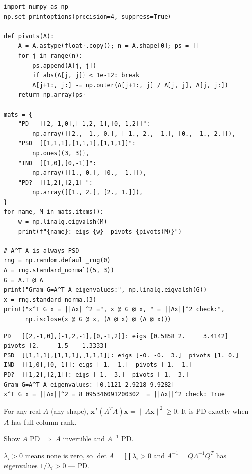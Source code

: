 \begin{lstlisting}[caption={\ttfamily code/ch09\_definiteness.py ---
eigenvalues vs.\ pivot signs on four matrices, then $A^{T}A$ is always
PSD.}]
import numpy as np
np.set_printoptions(precision=4, suppress=True)

def pivots(A):
    A = A.astype(float).copy(); n = A.shape[0]; ps = []
    for j in range(n):
        ps.append(A[j, j])
        if abs(A[j, j]) < 1e-12: break
        A[j+1:, j:] -= np.outer(A[j+1:, j] / A[j, j], A[j, j:])
    return np.array(ps)

mats = {
    "PD   [[2,-1,0],[-1,2,-1],[0,-1,2]]":
        np.array([[2., -1., 0.], [-1., 2., -1.], [0., -1., 2.]]),
    "PSD  [[1,1,1],[1,1,1],[1,1,1]]":
        np.ones((3, 3)),
    "IND  [[1,0],[0,-1]]":
        np.array([[1., 0.], [0., -1.]]),
    "PD?  [[1,2],[2,1]]":
        np.array([[1., 2.], [2., 1.]]),
}
for name, M in mats.items():
    w = np.linalg.eigvalsh(M)
    print(f"{name}: eigs {w}  pivots {pivots(M)}")

# A^T A is always PSD
rng = np.random.default_rng(0)
A = rng.standard_normal((5, 3))
G = A.T @ A
print("Gram G=A^T A eigenvalues:", np.linalg.eigvalsh(G))
x = rng.standard_normal(3)
print("x^T G x = ||Ax||^2 =", x @ G @ x, " = ||Ax||^2 check:",
      np.isclose(x @ G @ x, (A @ x) @ (A @ x)))
\end{lstlisting}

\begin{lstlisting}[caption={Output of the definiteness tests. Notice
pivots and eigenvalues agree in sign pattern on every case --- and the
Gram matrix's eigenvalues are all $\ge0$ because $x^{T}Gx=\lVert
Ax\rVert^{2}$ is a squared length, never negative.}]
PD   [[2,-1,0],[-1,2,-1],[0,-1,2]]: eigs [0.5858 2.     3.4142]  pivots [2.     1.5    1.3333]
PSD  [[1,1,1],[1,1,1],[1,1,1]]: eigs [-0. -0.  3.]  pivots [1. 0.]
IND  [[1,0],[0,-1]]: eigs [-1.  1.]  pivots [ 1. -1.]
PD?  [[1,2],[2,1]]: eigs [-1.  3.]  pivots [ 1. -3.]
Gram G=A^T A eigenvalues: [0.1121 2.9218 9.9282]
x^T G x = ||Ax||^2 = 8.095346091200302  = ||Ax||^2 check: True
\end{lstlisting}

\begin{proposition}
For any real $A$ (any shape),
$\mathbf x^{T}(A^{T}A)\mathbf x=\lVert A\mathbf x\rVert^{2}\ge0$. It is PD
exactly when $A$ has full column rank.
\end{proposition}

\begin{exercise}[medium]
Show $A$ PD $\Rightarrow$ $A$ invertible and $A^{-1}$ PD.
\begin{solution}
$\lambda_i>0$ means none is zero, so $\det A=\prod\lambda_i>0$ and
$A^{-1}=Q\Lambda^{-1}Q^{T}$ has eigenvalues $1/\lambda_i>0$ --- PD.
\end{solution}
\end{exercise}

